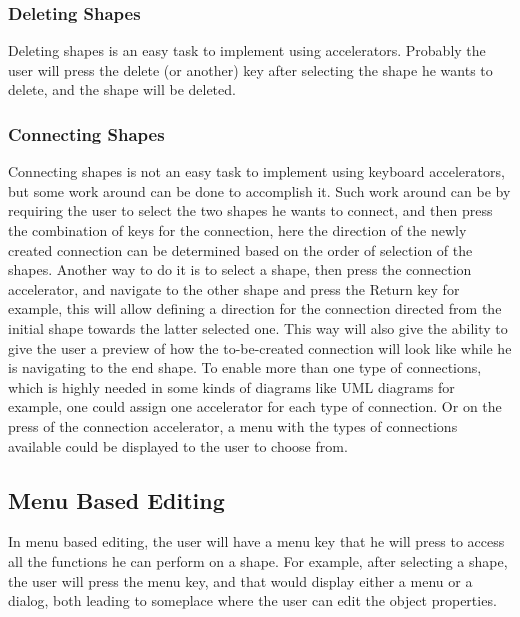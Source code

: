 \subsubsection {Deleting Shapes}
Deleting shapes is an easy task to implement using accelerators. Probably the user will press the delete (or another) key after selecting the shape he wants to delete, and the shape will be deleted.

\subsubsection {Connecting Shapes}
Connecting shapes is not an easy task to implement using keyboard accelerators, but some work around can be done to accomplish it. Such work around can be by requiring the user to select the two shapes he wants to connect, and then press the combination of keys for the connection, here the direction of the newly created connection can be determined based on the order of selection of the shapes. Another way to do it is to select a shape,  then press the connection accelerator, and navigate to the other shape and press the Return key for example, this will allow defining a direction for the connection directed from the initial shape towards the latter selected one. This way will also give the ability to give the user a preview of how the to-be-created connection will look like while he is navigating to the end shape. To enable more than one type of connections, which is highly needed in some kinds of diagrams like UML diagrams for example, one could assign one accelerator for each type of connection. Or on the press of the connection accelerator, a menu with the types of connections available could be displayed to the user to choose from.

\subsection{Menu Based Editing}
In menu based editing, the user will have a menu key that he will press to access all the functions he can perform on a shape. For example, after selecting a shape, the user will press the menu key, and that would display either a menu or a dialog, both leading to someplace where the user can edit the object properties.

